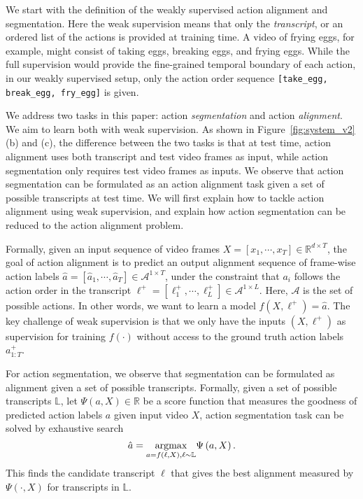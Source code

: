 \documentclass[10pt,twocolumn,letterpaper]{article}
\begin{document}
We start with the definition of the weakly supervised action alignment and segmentation. Here the weak supervision means that only the \emph{transcript}, or an ordered list of the actions is provided at training time. A video of frying eggs, for example, might consist of taking eggs, breaking eggs, and frying eggs. While the full supervision would provide the fine-grained temporal boundary of each action, in our weakly supervised setup, only the action order sequence \verb|[take_egg, break_egg, fry_egg]| is given. 


We address two tasks in this paper: action \emph{segmentation} and action \emph{alignment}. We aim to learn both with weak supervision. As shown in Figure~\ref{fig:system_v2}(b) and (c), the difference between the two tasks is that at test time, action alignment uses both transcript and test video frames as input, while action segmentation only requires  test video frames as inputs. We observe that action segmentation can be formulated as an action alignment task given a set of possible transcripts at test time. We will first explain how to tackle action alignment using weak supervision, and explain how action segmentation can be reduced to the action alignment problem.


Formally, given an input sequence of video frames $X = [x_1, \cdots, x_{T}] \in \mathbb{R}^{d \times T}$, the goal of action alignment is to predict an output alignment sequence of frame-wise action labels $\hat a = [\hat a_1, \cdots, \hat a_{T}] \in \mathcal{A}^{1\times T}$, under the constraint that $a_i$ follows the action order in the transcript  $\ell^+ = [\ell^+_1, \cdots, \ell^+_{L}]\in \mathcal{A}^{1\times L}$. Here, $\mathcal{A}$ is the set of possible actions. In other words, we want to learn a model $f(X, \ell^+) = \hat{a}$. The key challenge of weak supervision is that we only have the inputs $(X, \ell^+)$ as supervision for training $f(\cdot)$ without access to the ground truth action labels $a^+_{1:T}$.

For action segmentation, we observe that segmentation can be formulated as alignment given a set of possible transcripts. Formally, given a set of possible transcripts $\mathbb{L}$, let $\Psi(a, X) \in \mathbb{R}$ be a score function that measures the goodness of predicted action labels $a$ given input video $X$, action segmentation task can be solved by exhaustive search
\begin{equation}
\vspace{-1mm}
\label{eq:unified}
\small
\hat a = \underset{a = f(\ell,X), \ell \sim \mathbb{L}}{\mathrm{arg max}} \Psi \left (a, X\right).
\end{equation}
This finds the candidate transcript $\ell$ that gives the best alignment measured by $\Psi(\cdot, X)$ for transcripts in $\mathbb{L}$.
\end{document}
